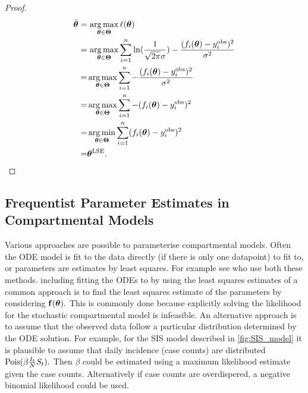 \begin{proof}
    \begin{align*}
        \hat{\bm{\theta}}
        = & \, \operatorname*{arg\,max}_{\bm{\theta}\in\mathbf{\Theta}}\ell(\bm{\theta}) \\
        = & \, \operatorname*{arg\,max}_{\bm{\theta}\in\mathbf{\Theta}}
        \sum_{i = 1}^n
        \ln(\frac{1}{\sqrt{2\pi}\sigma})
        -\frac{(f_i(\bm{\theta})- y_i^{\mathrm{obs}})^2}{\sigma^2}            \\
        = & \operatorname*{arg\,max}_{\bm{\theta}\in\mathbf{\Theta}} \sum_{i = 1}^n
        - \frac{(f_i(\bm{\theta})- y_i^{\mathrm{obs}})^2 }{\sigma^2}          \\
        = & \operatorname*{arg\,max}_{\bm{\theta}\in\mathbf{\Theta}} \sum_{i = 1}^n
        - (f_i(\bm{\theta})- y_i^{\mathrm{obs}})^2                            \\
        = & \operatorname*{arg\,min}_{\bm{\theta}\in\mathbf{\Theta}} \sum_{i = 1}^n
        (f_i(\bm{\theta})- y_i^{\mathrm{obs}})^2                              \\
        = & \bm{\theta}^{\mathrm{LSE}}.
    \end{align*}
\end{proof}

\subsection*{Frequentist Parameter Estimates in Compartmental Models}

Various approaches are possible to parameterise compartmental models.
Often the ODE model is fit to the data directly (if there is only one datapoint)
to fit to, or parameters are estimates by least squares. For example see
\cite{gani_transmission_2001} who use both these methods.
including fitting the ODEs to by using the least squares estimates of
a common approach is to find the least squares 
estimate of the parameters by considering $\mathbf{f}(\bm{\theta}).$
This is commonly done because explicitly solving the likelihood for 
the stochastic compartmental model is infeasible. An alternative approach
is to assume that the observed data follow a particular distribution
determined by the ODE solution. For example, for the SIS model described
in \ref{fig:SIS_model} it is plausible to assume that
daily incidence (case counts) are distributed $\operatorname{Pois}(\beta \frac{I_t}{N}S_t).$ 
Then $\beta$ could be estimated using a maximum likelihood estimate given the 
case counts.
Alternatively if case counts are overdispered, a negative binomial likelihood
could be used.

\begin{figure}
\end{figure}